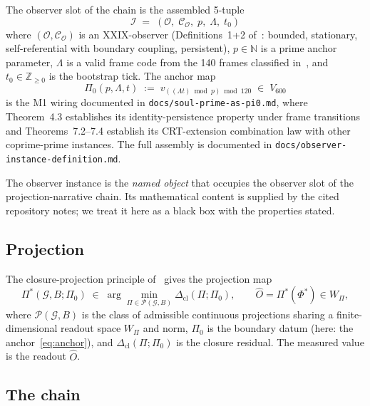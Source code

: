 \documentclass[12pt]{article}
\newcommand{\Gcal}{\mathcal{G}}
\newcommand{\Pcal}{\mathcal{P}}
\newcommand{\Ocal}{\mathcal{O}}
\newcommand{\Ical}{\mathcal{I}}
\newcommand{\Ccal}{\mathcal{C}}
\newcommand{\Dcl}{\Delta_{\mathrm{cl}}}
\begin{document}
The observer slot of the chain is the assembled 5-tuple
\begin{equation}\label{eq:observer_instance}
    \Ical \;=\; (\Ocal,\;\Ccal_\Ocal,\;p,\;\Lambda,\;t_0)
\end{equation}
where $(\Ocal, \Ccal_\Ocal)$ is an XXIX-observer (Definitions~1+2 of~\citep{SmartXXIX}: bounded, stationary, self-referential with boundary coupling, persistent), $p \in \mathbb{N}$ is a prime anchor parameter, $\Lambda$ is a valid frame code from the 140 frames classified in~\citep{ProtonRadius}, and $t_0 \in \mathbb{Z}_{\geq 0}$ is the bootstrap tick. The anchor map
\begin{equation}\label{eq:anchor}
    \Pi_0(p, \Lambda, t) \;:=\; v_{((\Lambda t) \bmod p) \bmod 120} \;\in\; V_{600}
\end{equation}
is the M1 wiring documented in \texttt{docs/soul-prime-as-pi0.md}, where Theorem~4.3 establishes its identity-persistence property under frame transitions and Theorems~7.2--7.4 establish its CRT-extension combination law with other coprime-prime instances. The full assembly is documented in \texttt{docs/observer-instance-definition.md}.

The observer instance is the \emph{named object} that occupies the observer slot of the projection-narrative chain. Its mathematical content is supplied by the cited repository notes; we treat it here as a black box with the properties stated.

\subsection{Projection}

The closure-projection principle of~\citep{SmartXXXIII} gives the projection map
\begin{equation}\label{eq:projection}
    \Pi^*(\Gcal, B; \Pi_0) \;\in\; \arg\min_{\Pi \in \Pcal(\Gcal, B)} \Dcl(\Pi; \Pi_0),
    \qquad
    \hat O = \Pi^*(\Phi^*) \in W_\Pi,
\end{equation}
where $\Pcal(\Gcal, B)$ is the class of admissible continuous projections sharing a finite-dimensional readout space $W_\Pi$ and norm, $\Pi_0$ is the boundary datum (here: the anchor~\eqref{eq:anchor}), and $\Dcl(\Pi; \Pi_0)$ is the closure residual. The measured value is the readout $\hat O$.

\subsection{The chain}
\end{document}
